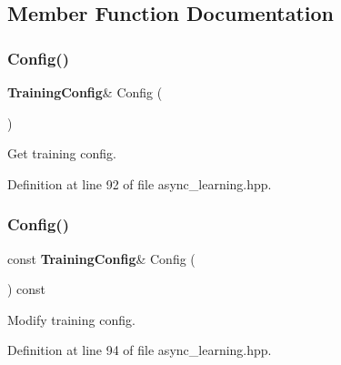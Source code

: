 \subsection{Member Function Documentation}
\mbox{\label{classmlpack_1_1rl_1_1AsyncLearning_a9428142f6a4c6d03657200fde2dda9c9}} 
\subsubsection{Config()\hspace{0.1cm}{\footnotesize\ttfamily [1/2]}}
{\footnotesize\ttfamily \textbf{ Training\+Config}\& Config (\begin{DoxyParamCaption}{ }\end{DoxyParamCaption})\hspace{0.3cm}{\ttfamily [inline]}}



Get training config. 



Definition at line 92 of file async\+\_\+learning.\+hpp.

\mbox{\label{classmlpack_1_1rl_1_1AsyncLearning_a10bc8bd4dab7fba79b770fdd1bb63a8f}} 
\subsubsection{Config()\hspace{0.1cm}{\footnotesize\ttfamily [2/2]}}
{\footnotesize\ttfamily const \textbf{ Training\+Config}\& Config (\begin{DoxyParamCaption}{ }\end{DoxyParamCaption}) const\hspace{0.3cm}{\ttfamily [inline]}}



Modify training config. 



Definition at line 94 of file async\+\_\+learning.\+hpp.

\mbox{\label{classmlpack_1_1rl_1_1AsyncLearning_a59cc43eb892c46ea7c50e18fb78b9172}} 
